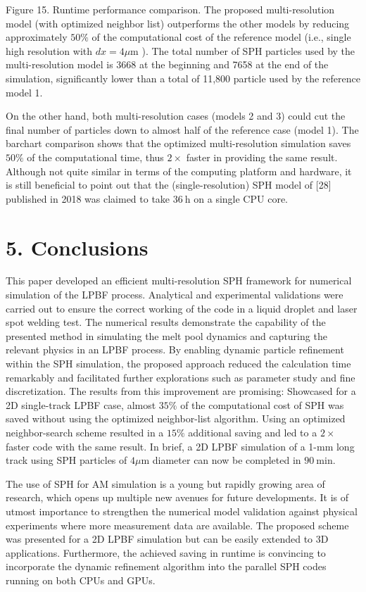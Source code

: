 \documentclass[10pt]{article}
\begin{document}
Figure 15. Runtime performance comparison. The proposed multi-resolution model (with optimized neighbor list) outperforms the other models by reducing approximately $50 \%$ of the computational cost of the reference model (i.e., single high resolution with $d x=4 \mu \mathrm{m}$ ). The total number of SPH particles used by the multi-resolution model is 3668 at the beginning and 7658 at the end of the simulation, significantly lower than a total of 11,800 particle used by the reference model 1.

On the other hand, both multi-resolution cases (models 2 and 3) could cut the final number of particles down to almost half of the reference case (model 1). The barchart comparison shows that the optimized multi-resolution simulation saves $50 \%$ of the computational time, thus $2 \times$ faster in providing the same result. Although not quite similar in terms of the computing platform and hardware, it is still beneficial to point out that the (single-resolution) SPH model of [28] published in 2018 was claimed to take $36 \mathrm{~h}$ on a single CPU core.

\section*{5. Conclusions}
This paper developed an efficient multi-resolution SPH framework for numerical simulation of the LPBF process. Analytical and experimental validations were carried out to ensure the correct working of the code in a liquid droplet and laser spot welding test. The numerical results demonstrate the capability of the presented method in simulating the melt pool dynamics and capturing the relevant physics in an LPBF process. By enabling dynamic particle refinement within the SPH simulation, the proposed approach reduced the calculation time remarkably and facilitated further explorations such as parameter study and fine discretization. The results from this improvement are promising: Showcased for a 2D single-track LPBF case, almost $35 \%$ of the computational cost of SPH was saved without using the optimized neighbor-list algorithm. Using an optimized neighbor-search scheme resulted in a $15 \%$ additional saving and led to a $2 \times$ faster code with the same result. In brief, a 2D LPBF simulation of a 1-mm long track using SPH particles of $4 \mu \mathrm{m}$ diameter can now be completed in $90 \mathrm{~min}$.

The use of SPH for AM simulation is a young but rapidly growing area of research, which opens up multiple new avenues for future developments. It is of utmost importance to strengthen the numerical model validation against physical experiments where more measurement data are available. The proposed scheme was presented for a 2D LPBF simulation but can be easily extended to 3D applications. Furthermore, the achieved saving in runtime is convincing to incorporate the dynamic refinement algorithm into the parallel SPH codes running on both CPUs and GPUs.
\end{document}

